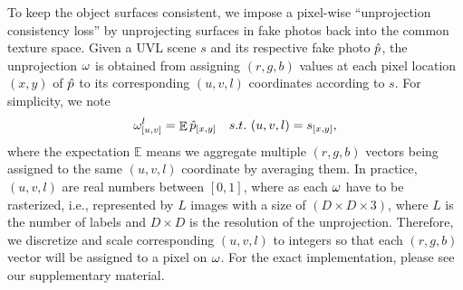 \documentclass{article}
\begin{document}
		To keep the object surfaces consistent, we impose a pixel-wise ``unprojection consistency loss'' by unprojecting surfaces in fake photos back into the common texture space.
        Given a UVL scene $s$ and its respective fake photo $\hat{p}$, the unprojection $\omega$ is obtained from assigning $(r,g,b)$ values at each pixel location $(x, y)$ of $\hat{p}$ to its corresponding $(u, v, l)$ coordinates according to $s$. 
        For simplicity, we note
        \begin{equation}
            	\omega_{[u,v]}^{l}=\mathop{\mathbb{E}}\hat{p}_{[x,y]} \quad s.t.~ (u,v,l) = s_{[x,y]},
        \end{equation}
        where the expectation $\mathbb{E}$ means we aggregate multiple $(r,g,b)$ vectors being assigned to the same $(u,v,l)$ coordinate by averaging them.
        In practice, $(u,v,l)$ are real numbers between $[0,1]$, where as each $\omega$ have to be rasterized, i.e., represented by $L$ images with a size of $(D\times D\times 3)$, where $L$ is the number of labels and $D\times D$ is the resolution of the unprojection. Therefore, we discretize and scale corresponding $(u,v,l)$ to integers so that each $(r,g,b)$ vector will be assigned to a pixel on $\omega$. For the exact implementation, please see our supplementary material.
        
\end{document}
